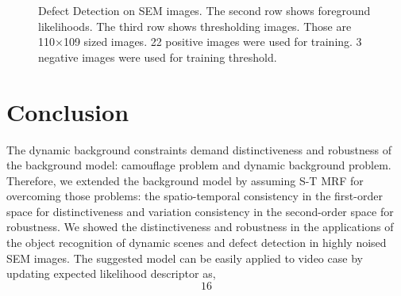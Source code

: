 \documentclass[conference]{IEEEtran}
\begin{document}
\begin{figure}[!t]
  \hfill
  \hfill
  \hfill
  \caption{Defect Detection on SEM images. The second row shows foreground likelihoods. The third row shows thresholding images. Those are 110×109 sized images. 22 positive images were used for training. 3 negative images were used for training threshold.}
\end{figure}



\section{Conclusion}

The dynamic background constraints demand distinctiveness and robustness of the background model: camouflage problem and dynamic background problem. Therefore, we extended the background model by assuming S-T MRF for overcoming those problems: the spatio-temporal consistency in the first-order space for distinctiveness and variation consistency in the second-order space for robustness. We showed the distinctiveness and robustness in the applications of the object recognition of dynamic scenes and defect detection in highly noised SEM images.
The suggested model can be easily applied to video case by updating expected likelihood descriptor   as,
\begin{equation}
  16
\end{equation}
\end{document}
